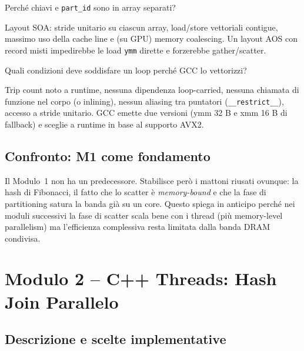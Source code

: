 \documentclass[11pt,a4paper]{article}
\theoremstyle{remark}
\newenvironment{esercizio}[1][]{%
  \begin{tcolorbox}[breakable,title={\textbf{Esercizio / Domanda d'esame}\ifx&#1&\else: #1\fi},
    colback=yellow!5!white, colframe=orange!75!black, fonttitle=\small\bfseries]%
}{%
  \end{tcolorbox}%
}
\newenvironment{risposta}{%
  \begin{tcolorbox}[breakable,title={\textbf{Risposta}},
    colback=green!5!white, colframe=green!50!black, fonttitle=\small\bfseries]%
}{%
  \end{tcolorbox}%
}
\begin{document}
\begin{esercizio}[M1 -- AOS vs SOA]
Perch\'e chiavi e \texttt{part\_id} sono in array separati?
\end{esercizio}
\begin{risposta}
Layout SOA: stride unitario su ciascun array, load/store vettoriali contigue, massimo uso della cache line e (su GPU) memory coalescing. Un layout AOS con record misti impedirebbe le load \texttt{ymm} dirette e forzerebbe gather/scatter.
\end{risposta}

\begin{esercizio}[M1 -- Auto-vectorization]
Quali condizioni deve soddisfare un loop perch\'e GCC lo vettorizzi?
\end{esercizio}
\begin{risposta}
Trip count noto a runtime, nessuna dipendenza loop-carried, nessuna chiamata di funzione nel corpo (o inlining), nessun aliasing tra puntatori (\texttt{\_\_restrict\_\_}), accesso a stride unitario. GCC emette due versioni (ymm 32 B e xmm 16 B di fallback) e sceglie a runtime in base al supporto AVX2.
\end{risposta}

\subsection{Confronto: M1 come fondamento}

Il Modulo~1 non ha un predecessore. Stabilisce per\`o i mattoni riusati ovunque: la hash di Fibonacci, il fatto che lo scatter \`e \emph{memory-bound} e che la fase di partitioning satura la banda gi\`a su un core. Questo spiega in anticipo perch\'e nei moduli successivi la fase di scatter scala bene con i thread (pi\`u memory-level parallelism) ma l'efficienza complessiva resta limitata dalla banda DRAM condivisa.


\section{Modulo 2 -- C++ Threads: Hash Join Parallelo}
\label{sec:m2}

\subsection{Descrizione e scelte implementative}
\end{document}
